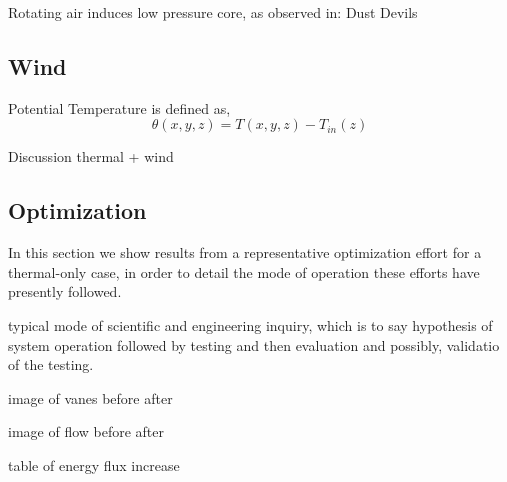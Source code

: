 Rotating air induces low pressure core, as observed in:
Dust Devils

\subsection{Wind}

Potential Temperature is defined as,
\begin{equation}
  \theta(x,y,z) = T(x,y,z) -T_{in}(z) 
\end{equation}

Discussion thermal + wind

\subsection{Optimization}

In this section we show results from a representative optimization
effort for a thermal-only case, in order to detail the mode of operation
these efforts have presently followed. 

typical mode of scientific and engineering inquiry, which is to say
hypothesis of system operation followed by testing and then evaluation
and possibly, validatio of the testing. 

image of vanes before after

image of flow before after

table of energy flux increase